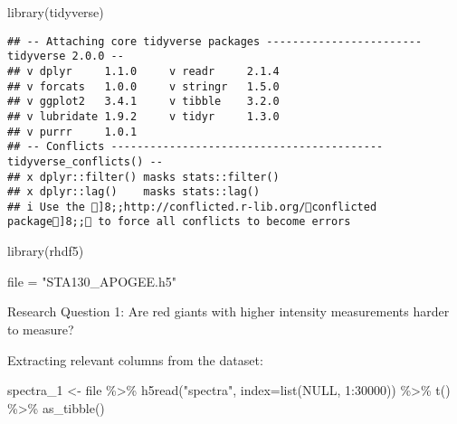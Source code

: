 \documentclass[
]{article}
\author{}
\date{\vspace{-2.5em}}
\newenvironment{Shaded}{\begin{snugshade}}{\end{snugshade}}
\newcommand{\AttributeTok}[1]{\textcolor[rgb]{0.77,0.63,0.00}{#1}}
\newcommand{\ConstantTok}[1]{\textcolor[rgb]{0.00,0.00,0.00}{#1}}
\newcommand{\DecValTok}[1]{\textcolor[rgb]{0.00,0.00,0.81}{#1}}
\newcommand{\FunctionTok}[1]{\textcolor[rgb]{0.00,0.00,0.00}{#1}}
\newcommand{\NormalTok}[1]{#1}
\newcommand{\OtherTok}[1]{\textcolor[rgb]{0.56,0.35,0.01}{#1}}
\newcommand{\SpecialCharTok}[1]{\textcolor[rgb]{0.00,0.00,0.00}{#1}}
\newcommand{\StringTok}[1]{\textcolor[rgb]{0.31,0.60,0.02}{#1}}
\begin{document}
\begin{Shaded}
\begin{Highlighting}[]
\FunctionTok{library}\NormalTok{(tidyverse)}
\end{Highlighting}
\end{Shaded}

\begin{verbatim}
## -- Attaching core tidyverse packages ------------------------ tidyverse 2.0.0 --
## v dplyr     1.1.0     v readr     2.1.4
## v forcats   1.0.0     v stringr   1.5.0
## v ggplot2   3.4.1     v tibble    3.2.0
## v lubridate 1.9.2     v tidyr     1.3.0
## v purrr     1.0.1     
## -- Conflicts ------------------------------------------ tidyverse_conflicts() --
## x dplyr::filter() masks stats::filter()
## x dplyr::lag()    masks stats::lag()
## i Use the ]8;;http://conflicted.r-lib.org/conflicted package]8;; to force all conflicts to become errors
\end{verbatim}

\begin{Shaded}
\begin{Highlighting}[]
\FunctionTok{library}\NormalTok{(rhdf5)}
\end{Highlighting}
\end{Shaded}

\begin{Shaded}
\begin{Highlighting}[]
\NormalTok{file }\OtherTok{=} \StringTok{"STA130\_APOGEE.h5"}
\end{Highlighting}
\end{Shaded}

Research Question 1: Are red giants with higher intensity measurements
harder to measure?

Extracting relevant columns from the dataset:

\begin{Shaded}
\begin{Highlighting}[]
\NormalTok{spectra\_1 }\OtherTok{\textless{}{-}}\NormalTok{ file }\SpecialCharTok{\%\textgreater{}\%} \FunctionTok{h5read}\NormalTok{(}\StringTok{"spectra"}\NormalTok{, }\AttributeTok{index=}\FunctionTok{list}\NormalTok{(}\ConstantTok{NULL}\NormalTok{, }\DecValTok{1}\SpecialCharTok{:}\DecValTok{30000}\NormalTok{)) }\SpecialCharTok{\%\textgreater{}\%} \FunctionTok{t}\NormalTok{() }\SpecialCharTok{\%\textgreater{}\%} \FunctionTok{as\_tibble}\NormalTok{()}
\end{Highlighting}
\end{Shaded}
\end{document}
